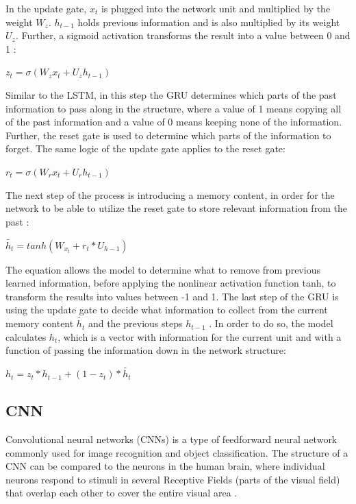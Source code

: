\indent\newline 
In the update gate, $x_{t}$ is plugged into the network unit and multiplied by the weight $W_{z}$. $h_{t-1}$ holds previous information and is also multiplied by its weight $U_{z}$. Further, a sigmoid activation transforms the result into a value between 0 and 1 \cite{kosta}:

\indent\newline 
$z_{t} = \sigma(W_{z} x_{t} + U_{z} h_{t-1})$

\indent\newline 
Similar to the LSTM, in this step the GRU determines which parts of the past information to pass along in the structure, where a value of 1 means copying all of the past information and a value of 0 means keeping none of the information. Further, the reset gate is used to determine which parts of the information to forget. The same logic of the update gate applies to the reset gate:

\indent\newline 
$r_{t} = \sigma(W_{r} x_{t} + U_{r} h_{t-1})$

\indent\newline 
The next step of the process is introducing a memory content, in order for the network to be able to utilize the reset gate to store relevant information from the past \cite{kosta}:

\indent\newline 
$\tilde{h_{t}} = tanh(W_{x_{t}} + r_{t} * U_{h-1})$

\indent\newline 
The equation allows the model to determine what to remove from previous learned information, before applying the nonlinear activation function tanh, to transform the results into values between -1 and 1. The last step of the GRU is using the update gate to decide what information to collect from the current memory content $\tilde{h_{t}}$ and the previous steps $h_{t-1}$ \cite{kosta}. In order to do so, the model calculates $h_{t}$, which is a vector with information for the current unit and with a function of passing the information down in the network structure:

\indent\newline 
$h_{t} = z_{t} * h_{t-1} + (1 - z_{t}) * \tilde{h_{t}}$

\subsection{CNN}
Convolutional neural networks (CNNs) is a type of feedforward neural network commonly used for image recognition and object classification. The structure of a CNN can be compared to the neurons in the human brain, where individual neurons respond to stimuli in several Receptive Fields (parts of the visual field) that overlap each other to cover the entire visual area \cite{saha}.   

